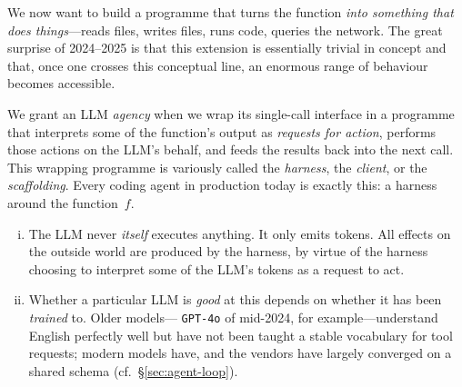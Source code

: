 \begin{center}
\end{center}

We now want to build a programme that turns the function \emph{into
something that does things}---reads files, writes files, runs code,
queries the network.  The great surprise of 2024--2025 is that this
extension is essentially trivial in concept and that, once one
crosses this conceptual line, an enormous range of behaviour
becomes accessible.

\begin{definition}\label{def:agency}
  We grant an LLM \emph{agency} when we wrap its single-call
  interface in a programme that interprets some of the function's
  output as \emph{requests for action}, performs those actions on
  the LLM's behalf, and feeds the results back into the next call.
  This wrapping programme is variously called the \emph{harness},
  the \emph{client}, or the \emph{scaffolding}.  Every coding agent
  in production today is exactly this: a harness around the function~$f$.
\end{definition}

\begin{keyresult}
  \begin{enumerate}[(i)]
    \item The LLM never \emph{itself} executes anything.  It only
      emits tokens.  All effects on the outside world are produced
      by the harness, by virtue of the harness choosing to
      interpret some of the LLM's tokens as a request to act.
    \item Whether a particular LLM is \emph{good} at this depends
      on whether it has been \emph{trained} to.  Older models---
      \texttt{GPT-4o} of mid-2024, for example---understand
      English perfectly well but have not been taught a stable
      vocabulary for tool requests; modern models have, and the
      vendors have largely converged on a shared schema
      (cf.~\S\ref{sec:agent-loop}).
  \end{enumerate}
\end{keyresult}


